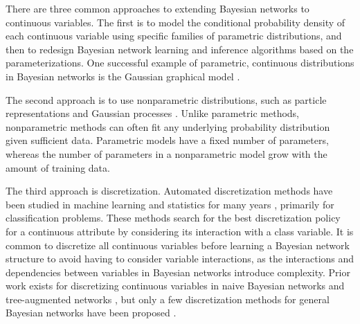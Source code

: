 There are three common approaches to extending Bayesian networks to continuous variables.
The first is to model the conditional probability density of each continuous variable using specific families of parametric distributions, and then to redesign Bayesian network learning and inference algorithms based on the parameterizations.
One successful example of parametric, continuous distributions in Bayesian networks is the Gaussian graphical model \citep{Weiss_2011}. 

The second approach is to use nonparametric distributions, such as particle representations and Gaussian processes \citep{Ickstadt_2010}.
Unlike parametric methods, nonparametric methods can often fit any underlying probability distribution given sufficient data.
Parametric models have a fixed number of parameters, whereas the number of parameters in a nonparametric model grow with the amount of training data.

The third approach is discretization.
Automated discretization methods have been studied in machine learning and statistics for many years \citep{Dougherty_1995, Kerber_1992, Holte_1993, Fayyad_1993}, primarily for classification problems.
These methods search for the best discretization policy for a continuous attribute by considering its interaction with a class variable.
It is common to discretize all continuous variables before learning a Bayesian network structure to avoid having to consider variable interactions, as the interactions and dependencies between variables in Bayesian networks introduce complexity.
Prior work exists for discretizing continuous variables in naive Bayesian networks and tree-augmented networks \citep{Fried_naive}, but only a few discretization methods for general Bayesian networks have been proposed \citep{Friedman_1996, Kozlov_1997, Monti_1998, Steck_2007}.

